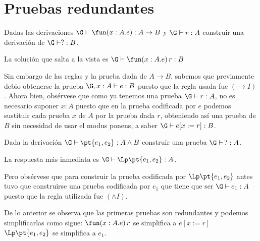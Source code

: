 \documentclass[11pt,letterpaper]{article}
\begin{document}


\section{Pruebas redundantes}

\bi
\item Dadas las derivaciones $\G\vdash\fun (x:A.e):A\to B$ y $\G\vdash r:A$ 
construir una derivación de $\G\vdash ?:B$.
\bi
\item La solución que salta a la vista es $\G\vdash\fun(x:A.e)\,r:B$
\item Sin embargo de las reglas y la prueba dada de $A\to B$, sabemos que
   previamente debio obtenerse la prueba $\G,x:A\vdash e:B$ puesto que la
   regla usada fue $(\to I)$. Ahora bien,
   obsérvese que como ya tenemos una prueba $\G\vdash r:A$, no es necesario 
   suponer $x:A$ puesto que en la prueba codificada por $e$ podemos sustituir 
   cada prueba $x$ de $A$ por la prueba dada $r$, obteniendo así una prueba 
   de $B$ sin necesidad de usar el modus ponens, a saber $\G\vdash e[x:=r]:B$. 
\ei

\item Dada la derivación $\G\vdash \pt{e_1,e_2}:A\land B$ construir una
    prueba $\G\vdash\,?:A$.
\bi
\item La respuesta más inmediata es $\G\vdash\Lp\pt{e_1,e_2}:A$.
\item Pero obsérvese que para construir la prueba codificada por
  $\Lp\pt{e_1,e_2}$ antes tuvo que construirse una prueba codificada por $e_1$
  que tiene que ser $\G\vdash e_1:A$ puesto que la regla utilizada fue 
  $(\land I)$.
\ei

\ei
\ei

De lo anterior se observa que las primeras pruebas son redundantes y podemos 
simplificarlas como sigue:
\bc
$\fun(x:A.e)\,r$ se simplifica a $e[x:=r]$
\ec
\bc
$\Lp\pt{e_1,e_2}$ se simplifica a $e_1$.
\ec
\end{document}
